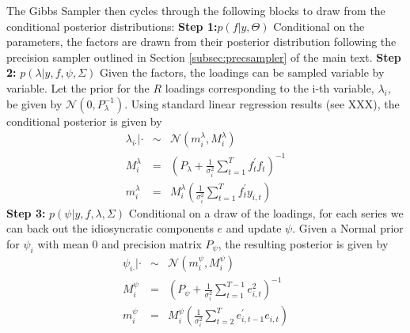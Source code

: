 \documentclass[notitlepage,a4paper,12pt]{article}
\begin{document}
The Gibbs Sampler then cycles through the following blocks to draw from the conditional posterior distributions:
\newline
\linebreak
\textbf{Step 1:}$p(f|y, \Theta)$
\newline
Conditional on the parameters, the factors are drawn from their posterior distribution following the precision sampler outlined in Section \ref{subsec:precsampler} of the main text.
\newline
\linebreak
\textbf{Step 2:} $p(\lambda| y, f, \psi, \Sigma)$
\newline
Given the factors, the loadings can be sampled variable by variable. Let the prior for the $R$  loadings corresponding to the i-th variable, $\lambda_i$, be given by $\mathcal{N}(0, P_{\lambda}^{-1})$. Using standard linear regression results (see XXX), the conditional posterior is given by
\begin{eqnarray}\label{eq:posterior_lambda}
    \lambda_{i \boldsymbol{\cdot} } | \cdot &\sim& \mathcal{N}\left( m^{\lambda}_i,M^{\lambda}_i \right) \\
    M^{\lambda}_i &=& \left( P_{\lambda} +  \frac{1}{\sigma^2_i} \sum\nolimits_{t=1}^T f_t^{\prime} f_t \right)^{-1}\\
    m^{\lambda}_i &=& M^{\lambda}_i \left( \frac{1}{\sigma^2_i}\sum\nolimits_{t=1}^T f_t^{\prime} y_{i,t} \right)
\end{eqnarray}  
\newline
\linebreak
\textbf{Step 3:} $p(\psi| y, f, \lambda, \Sigma)$
\newline       
 Conditional on a draw of the loadings, for each series we can back out the idiosyncratic components $e$ and update $\psi$. Given a Normal prior for $\psi_i$ with mean 0 and precision matrix $P_{\psi}$, the resulting posterior is given by 
    \begin{eqnarray}\label{eq:posterior_psi}
        \psi_{i \boldsymbol{\cdot} } | \cdot &\sim& \mathcal{N}\left( m^{\psi}_i,M^{\psi}_i \right) \\
        M^{\psi}_i &=& \left( P_{\psi} +  \frac{1}{\sigma^2_i} \sum\nolimits_{t=1}^{T-1} e_{i, t}^2 \right)^{-1}\\
        m^{\psi}_i &=& M^{\psi}_i \left( \frac{1}{\sigma^2_i}\sum\nolimits_{t=2}^T e_{i, t-1}^{\prime} e_{i,t} \right)
    \end{eqnarray}
\newline
\linebreak
\end{document}
